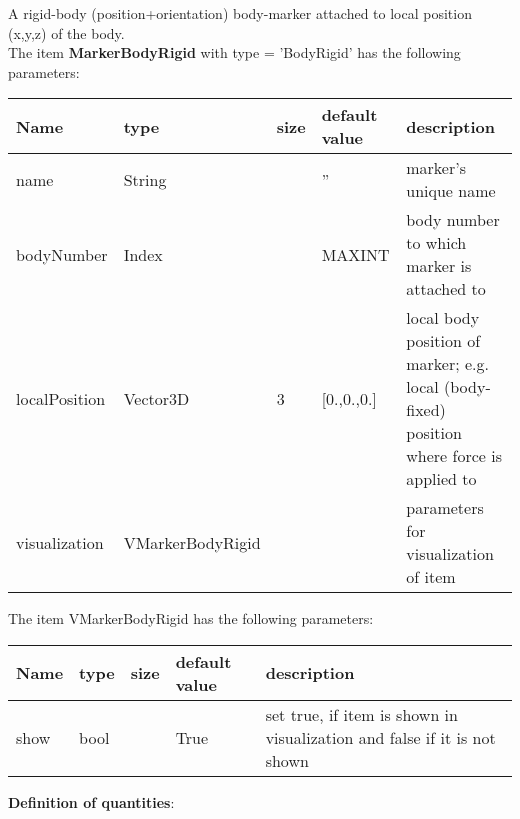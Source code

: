 A rigid-body (position+orientation) body-marker attached to local position (x,y,z) of the body.
 \\\vspace{12pt} \noindent The item {\bf MarkerBodyRigid} with type = 'BodyRigid' has the following parameters:\vspace{-1cm}\\ 
\begin{center}
  \footnotesize
  \begin{longtable}{| p{4.5cm} | p{2.5cm} | p{0.5cm} | p{2.5cm} | p{6cm} |}
    \hline
    \bf Name & \bf type & \bf size & \bf default value & \bf description \\ \hline
    name &     String &      &     '' &     marker's unique name\\ \hline
    bodyNumber &     Index &      &     MAXINT &     body number to which marker is attached to\\ \hline
    localPosition &     Vector3D &     3 &     [0.,0.,0.] &     local body position of marker; e.g. local (body-fixed) position where force is applied to\\ \hline
    visualization & VMarkerBodyRigid & & & parameters for visualization of item \\ \hline
	  \end{longtable}
	\end{center}
The item VMarkerBodyRigid has the following parameters:\vspace{-1cm}\\ 
\begin{center}
  \footnotesize
  \begin{longtable}{| p{4.5cm} | p{2.5cm} | p{0.5cm} | p{2.5cm} | p{6cm} |}
    \hline
    \bf Name & \bf type & \bf size & \bf default value & \bf description \\ \hline
    show &     bool &      &     True &     set true, if item is shown in visualization and false if it is not shown\\ \hline
	  \end{longtable}
	\end{center}
{\bf Definition of quantities}:\\
\newpage

